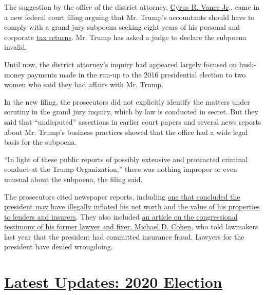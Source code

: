 The suggestion by the office of the district attorney,
\href{https://www.nytimes3xbfgragh.onion/2020/08/05/nyregion/trump-taxes-vance-deutsche-bank.html}{Cyrus
R. Vance Jr}., came in a new federal court filing arguing that Mr.
Trump's accountants should have to comply with a grand jury subpoena
seeking eight years of his personal and corporate
\href{https://www.nytimes3xbfgragh.onion/2020/08/05/nyregion/trump-taxes-vance-deutsche-bank.html}{tax
returns}. Mr. Trump has asked a judge to declare the subpoena invalid.

Until now, the district attorney's inquiry had appeared largely focused
on hush-money payments made in the run-up to the 2016 presidential
election to two women who said they had affairs with Mr. Trump.

In the new filing, the prosecutors did not explicitly identify the
matters under scrutiny in the grand jury inquiry, which by law is
conducted in secret. But they said that ``undisputed'' assertions in
earlier court papers and several news reports about Mr. Trump's business
practices showed that the office had a wide legal basis for the
subpoena.

``In light of these public reports of possibly extensive and protracted
criminal conduct at the Trump Organization,'' there was nothing improper
or even unusual about the subpoena, the filing said.

The prosecutors cited newspaper reports, including
\href{https://www.washingtonpost.com/graphics/2019/politics/trump-statements-of-financial-condition/}{one
that concluded the president may have illegally inflated his net worth
and the value of his properties to lenders and insurers}. They also
included
\href{https://www.wsj.com/articles/cohen-to-say-trump-knew-about-wikileaks-talks-engaged-in-criminal-conduct-while-in-office-11551249532}{an
article on the congressional testimony of his former lawyer and fixer,
Michael D. Cohen}, who told lawmakers last year that the president had
committed insurance fraud. Lawyers for the president have denied
wrongdoing.

\hypertarget{latest-updates-2020-election}{%
\section{\texorpdfstring{\href{https://www.nytimes3xbfgragh.onion/live/2020/08/19/us/dnc-convention-election?action=click\&pgtype=Article\&state=default\&region=MAIN_CONTENT_1\&context=storylines_live_updates}{Latest
Updates: 2020
Election}}{Latest Updates: 2020 Election}}\label{latest-updates-2020-election}}

